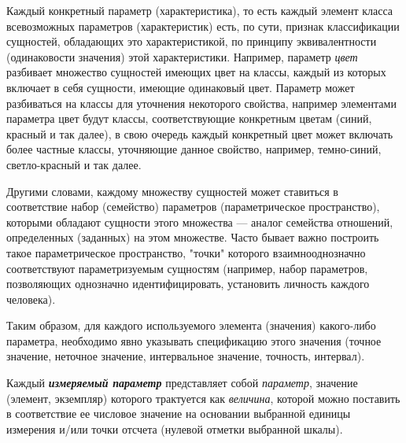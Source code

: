 \begin{SCn}
\begin{SCn}
Каждый конкретный параметр (характеристика), то есть каждый элемент класса всевозможных параметров (характеристик) есть, по сути, признак классификации сущностей, обладающих это характеристикой, по принципу эквивалентности (одинаковости значения) этой характеристики. Например, параметр \textit{цвет} разбивает множество сущностей имеющих цвет на классы, каждый из которых включает в себя сущности, имеющие одинаковый цвет. Параметр может разбиваться на классы для уточнения некоторого свойства, например элементами параметра цвет будут классы, соответствующие конкретным цветам (синий, красный и так далее), в свою очередь каждый конкретный цвет может включать более частные классы, уточняющие данное свойство, например, темно-синий, светло-красный и так далее.
		
Другими словами, каждому множеству сущностей может ставиться в соответствие набор (семейство) параметров (параметрическое пространство), которыми обладают сущности этого множества --- аналог семейства отношений, определенных (заданных) на этом множестве. Часто бывает важно построить такое параметрическое пространство, "точки"{} которого взаимнооднозначно соответствуют параметризуемым сущностям (например, набор параметров, позволяющих однозначно идентифицировать, установить личность каждого человека). 
		
Таким образом, для каждого используемого элемента (значения) какого-либо параметра, необходимо явно указывать спецификацию этого значения (точное значение, неточное значение, интервальное значение, точность, интервал).
		
\begin{SCn}

\bigskip
{}
\end{SCn}

Каждый \textbf{\textit{измеряемый параметр}} представляет собой \textit{параметр}, значение (элемент, экземпляр) которого трактуется как \textit{величина}, которой можно поставить в соответствие ее числовое значение на основании выбранной единицы измерения и/или точки отсчета (нулевой отметки выбранной шкалы).


\end{SCn}
\end{SCn}
